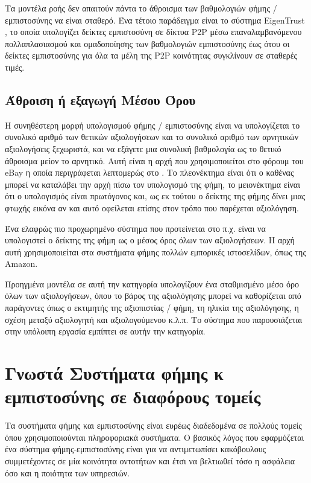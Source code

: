 Τα μοντέλα ροής δεν απαιτούν πάντα το άθροισμα των βαθμολογιών φήμης / εμπιστοσύνης να είναι σταθερό. Ένα τέτοιο παράδειγμα είναι το σύστημα EigenTrust \cite{EigenTrust}
, το οποία υπολογίζει δείκτες εμπιστοσύνη σε δίκτυα P2P μέσω επαναλαμβανόμενου πολλαπλασιασμού και  ομαδοποίησης των βαθμολογιών εμπιστοσύνης έως ότου οι δείκτες εμπιστοσύνης για όλα τα μέλη της P2P κοινότητας συγκλίνουν σε σταθερές τιμές.

\subsection{Άθροιση ή εξαγωγή Μέσου Όρου}

Η συνηθέστερη μορφή υπολογισμού φήμης / εμπιστοσύνης είναι να υπολογίζεται το συνολικό αριθμό των θετικών αξιολογήσεων και το συνολικό αριθμό των αρνητικών αξιολογήσεις ξεχωριστά, και να εξάγετε μια συνολική βαθμολογία ως το θετικό άθροισμα μείον το αρνητικό. Αυτή είναι η αρχή που χρησιμοποιείται στο φόρουμ του eBay η οποία περιγράφεται λεπτομερώς στο \cite{e-bay}. Το πλεονέκτημα είναι ότι ο καθένας μπορεί να καταλάβει την αρχή πίσω τον υπολογισμό της φήμη, το μειονέκτημα είναι ότι ο υπολογισμός είναι πρωτόγονος και, ως εκ τούτου ο δείκτης της φήμης δίνει μιας φτωχής εικόνα αν και αυτό οφείλεται επίσης στον τρόπο που παρέχεται αξιολόγηση.

Ένα ελαφρώς πιο προχωρημένο σύστημα που προτείνεται στο π.χ. \cite{amazon} είναι να υπολογιστεί ο δείκτης της φήμη ως ο μέσος όρος όλων των αξιολογήσεων. Η αρχή αυτή χρησιμοποιείται στα συστήματα φήμης πολλών εμπορικές ιστοσελίδων, όπως  της Amazon.

Προηγμένα μοντέλα σε αυτή την κατηγορία υπολογίζουν ένα σταθμισμένο μέσο όρο όλων των αξιολογήσεων, όπου το βάρος της αξιολόγησης μπορεί να καθορίζεται από παράγοντες όπως ο εκτιμητής της αξιοπιστίας / φήμη, τη ηλικία της αξιολόγησης, η σχέση μεταξύ αξιολογητή και αξιολογούμενου κ.λ.π. Το σύστημα που παρουσιάζεται στην υπόλοιπη εργασία εμπίπτει σε αυτήν την κατηγορία.
\newpage
\section{Γνωστά Συστήματα φήμης κ εμπιστοσύνης σε διαφόρους τομείς}\label{sec:prev}

Τα συστήματα φήμης και εμπιστοσύνης είναι ευρέως διαδεδομένα σε πολλούς τομείς όπου χρησιμοποιούνται πληροφοριακά συστήματα. Ο βασικός λόγος που εφαρμόζεται ένα σύστημα φήμης-εμπιστοσύνης είναι για να αντιμετωπίσει κακόβουλους συμμετέχοντες σε μία κοινότητα οντοτήτων και έτσι να βελτιωθεί τόσο η ασφάλεια όσο και η ποιότητα των υπηρεσιών.

